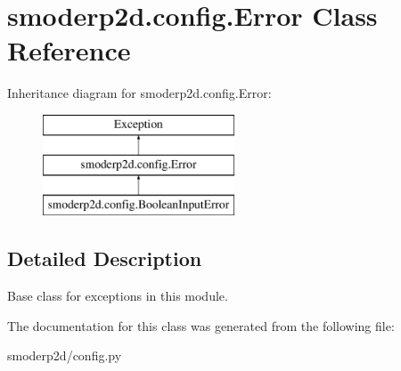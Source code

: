 \hypertarget{classsmoderp2d_1_1config_1_1Error}{\section{smoderp2d.\-config.\-Error Class Reference}
\label{classsmoderp2d_1_1config_1_1Error}
}
Inheritance diagram for smoderp2d.\-config.\-Error\-:\begin{figure}[H]
\begin{center}
\leavevmode
\includegraphics[height=3.000000cm]{classsmoderp2d_1_1config_1_1Error}
\end{center}
\end{figure}


\subsection{Detailed Description}
\begin{DoxyVerb}Base class for exceptions in this module.\end{DoxyVerb}
 

The documentation for this class was generated from the following file\-:\begin{DoxyCompactItemize}
\item 
smoderp2d/config.\-py\end{DoxyCompactItemize}
